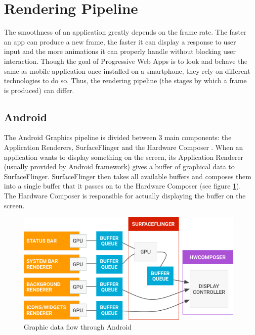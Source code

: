 \documentclass{kththesis}
\begin{document}
\section{Rendering Pipeline}

The smoothness of an application greatly depends on the frame rate. The faster an app can produce a new frame, the faster it can display a response to user input and the more animations it can properly handle without blocking user interaction. \newline
Though the goal of Progressive Web Apps is to look and behave the same as mobile application once installed on a smartphone, they rely on different technologies to do so. Thus, the rendering pipeline (the stages by which a frame is produced) can differ.


\subsection{Android}

The Android Graphics pipeline is divided between 3 main components: the Application Renderers, SurfaceFlinger and the Hardware Composer \cite{android_graphics}.
When an application wants to display something on the screen, its Application Renderer (usually provided by Android framework) gives a buffer of graphical data to SurfaceFlinger. SurfaceFlinger then takes all available buffers and composes them into a single buffer that it passes on to the Hardware Composer (see figure \ref{fig:android_data}). The Hardware Composer is responsible for actually displaying the buffer on the screen.
\newline

\begin{figure}[!ht]
    \includegraphics[width=13cm]{kththesis/Figures/android_data_flow.png}
    \caption[Graphic data flow through Android]{Graphic data flow through Android \footnotemark}
    \label{fig:android_data}
\end{figure}
\end{document}
